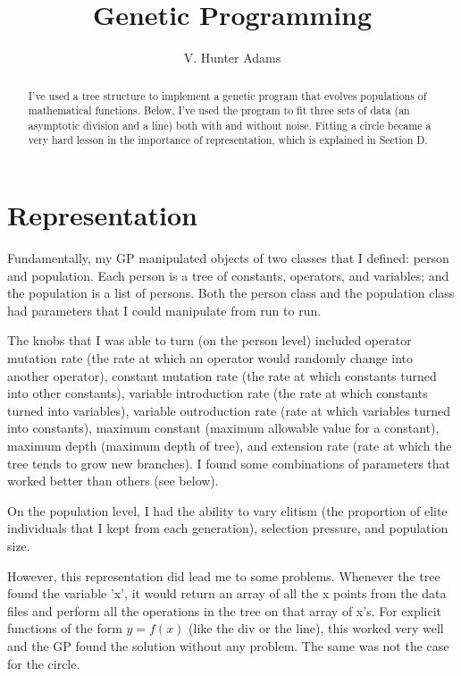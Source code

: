 \documentclass[11pt,amsmath,amssymb]{revtex4}
\begin{document}
\title{Genetic Programming}
\author{V. Hunter Adams}

\begin{abstract}
I've used a tree structure to implement a genetic program that evolves populations of mathematical functions. Below, I've used the program to fit three sets of data (an asymptotic division and a line) both with and without noise. Fitting a circle became a very hard lesson in the importance of representation, which is explained in Section D.
\end{abstract}
\maketitle


\section{Representation}
Fundamentally, my GP manipulated objects of two classes that I defined: person and population. Each person is a tree of constants, operators, and variables; and the population is a list of persons. Both the person class and the population class had parameters that I could manipulate from run to run.

The knobs that I was able to turn (on the person level) included operator mutation rate (the rate at which an operator would randomly change into another operator), constant mutation rate (the rate at which constants turned into other constants), variable introduction rate (the rate at which constants turned into variables), variable outroduction rate (rate at which variables turned into constants), maximum constant (maximum allowable value for a constant), maximum depth (maximum depth of tree), and extension rate (rate at which the tree tends to grow new branches). I found some combinations of parameters that worked better than others (see below).

On the population level, I had the ability to vary elitism (the proportion of elite individuals that I kept from each generation), selection pressure, and population size.

However, this representation did lead me to some problems. Whenever the tree found the variable 'x', it would return an array of all the x points from the data files and perform all the operations in the tree on that array of x's. For explicit functions of the form $y=f(x)$ (like the div or the line), this worked very well and the GP found the solution without any problem. The same was not the case for the circle.
\end{document}
